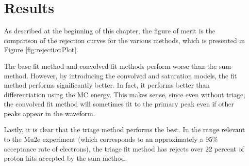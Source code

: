 \section{Results} 

As described at the beginning of this chapter, the figure of merit is the comparison of the rejection curves for the various methods, which is presented in Figure \ref{fig:rejectionPlot}.

The base fit method and convolved fit methods perform worse than the sum method. However, by introducing the convolved and saturation models, the fit method performs significantly better. In fact, it performs better than differentiation using the MC energy. This makes sense, since even without triage, the convolved fit method will sometimes fit to the primary peak even if other peaks appear in the waveform.

Lastly, it is clear that the triage method performs the best.  In the range relevant to the Mu2e experiment (which corresponds to an approximately a 95\% acceptance rate of electrons), the triage fit method has rejects over 22 percent of proton hits accepted by the sum method.






